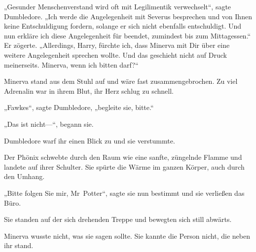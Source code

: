 „Gesunder Menschenverstand wird oft mit Legilimentik verwechselt“, sagte Dumbledore. „Ich werde die Angelegenheit mit Severus besprechen und von Ihnen keine Entschuldigung fordern, solange er sich nicht ebenfalls entschuldigt. Und nun erkläre ich diese Angelegenheit für beendet, zumindest bis zum Mittagessen.“ Er zögerte. „Allerdings, Harry, fürchte ich, dass Minerva mit Dir über eine weitere Angelegenheit sprechen wollte. Und das geschieht nicht auf Druck meinerseits. Minerva, wenn ich bitten darf?“

Minerva stand aus dem Stuhl auf und wäre fast zusammengebrochen. Zu viel Adrenalin war in ihrem Blut, ihr Herz schlug zu schnell.

„Fawkes“, sagte Dumbledore, „begleite sie, bitte.“

„Das ist nicht—“, begann sie.

Dumbledore warf ihr einen Blick zu und sie verstummte.

Der Phönix schwebte durch den Raum wie eine sanfte, züngelnde Flamme und landete auf ihrer Schulter. Sie spürte die Wärme im ganzen Körper, auch durch den Umhang.

„Bitte folgen Sie mir, Mr~Potter“, sagte sie nun bestimmt und sie verließen das Büro.

\later

Sie standen auf der sich drehenden Treppe und bewegten sich still abwärts.

Minerva wusste nicht, was sie sagen sollte. Sie kannte die Person nicht, die neben ihr stand.

